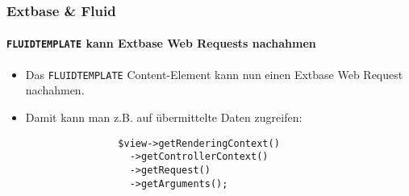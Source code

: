 \begin{frame}[fragile]
	\frametitle{Extbase \& Fluid}
	\framesubtitle{\texttt{FLUIDTEMPLATE} kann Extbase Web Requests nachahmen}

	\lstset{basicstyle=\small\ttfamily}

	\begin{itemize}
		\item Das \texttt{FLUIDTEMPLATE} Content-Element kann nun einen Extbase Web Request nachahmen.
		\item Damit kann man z.B. auf übermittelte Daten zugreifen:

			\begin{lstlisting}
				$view->getRenderingContext()
				  ->getControllerContext()
				  ->getRequest()
				  ->getArguments();
			\end{lstlisting}

	\end{itemize}

\end{frame}




